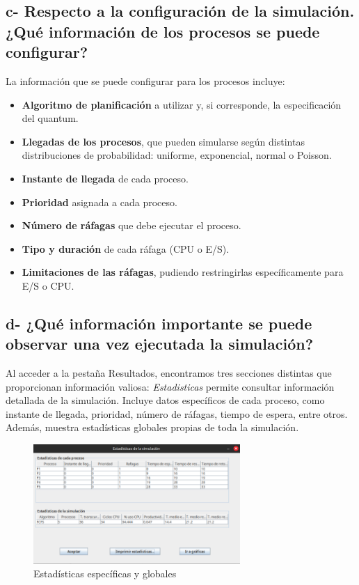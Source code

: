 \documentclass{article}
\begin{document}
\subsection*{c- Respecto a la configuración de la simulación. ¿Qué información de los procesos se puede configurar?}

\noindent
La información que se puede configurar para los procesos incluye:
\begin{itemize}
  \item \textbf{Algoritmo de planificación} a utilizar y, si corresponde, la especificación del quantum.
  \item \textbf{Llegadas de los procesos}, que pueden simularse según distintas distribuciones de probabilidad: 
  uniforme, exponencial, normal o Poisson.
  \item \textbf{Instante de llegada} de cada proceso.
  \item \textbf{Prioridad} asignada a cada proceso.
  \item \textbf{Número de ráfagas} que debe ejecutar el proceso.
  \item \textbf{Tipo y duración} de cada ráfaga (CPU o E/S).
  \item \textbf{Limitaciones de las ráfagas}, pudiendo restringirlas específicamente para E/S o CPU.\@
\end{itemize}

\subsection*{d- ¿Qué información importante se puede observar una vez ejecutada la simulación?}

\noindent
Al acceder a la pestaña Resultados, encontramos tres secciones distintas que proporcionan información valiosa:
\textit{Estadisticas}
permite consultar información detallada de la simulación. Incluye datos específicos de cada proceso, como instante de llegada,
prioridad, número de ráfagas, tiempo de espera, entre otros. Además, muestra estadísticas globales propias de toda la simulación.

\begin{figure}[h]
  \centering
  \includegraphics[width=0.7\textwidth]{resources/3dEst.png}
  \caption{Estadísticas específicas y globales}
\end{figure}
\end{document}
